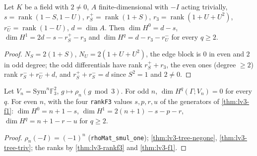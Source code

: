 \begin{theorem}\label{thm:lv3-tree-triv}
  \leanok
  Let $K$ be a field with $2\ne0$, $A$ finite-dimensional with $-I$ acting trivially, $s=\operatorname{rank}(1-S,1-U)$,
  $r_S^+=\operatorname{rank}(1+S)$, $r_3=\operatorname{rank}(1+U+U^2)$, $r_U^-=\operatorname{rank}(1-U)$, $d=\dim A$.  Then
  $\dim H^0=d-s$, $\dim H^1=2d-s-r_S^+-r_3$ and $\dim H^{q}=d-r_3-r_U^-$ for every $q\ge2$.
\end{theorem}
\begin{proof}
  \leanok
  $N_S=2(1+S)$, $N_U=2(1+U+U^2)$, the edge block is $0$ in even and $2$ in odd degree; the odd differentials have rank
  $r_S^++r_3$, the even ones (degree $\ge2$) rank $r_S^-+r_U^-+d$, and $r_S^++r_S^-=d$ since $S^2=1$ and $2\ne0$.
\end{proof}

\begin{theorem}\label{thm:lv3-v3-dims}
  \leanok
  Let $V_n=\mathrm{Sym}^n\mathbb F_3^2$, $g\mapsto\rho_n(g\bmod3)$.  For odd $n$, $\dim H^q(\Gamma;V_n)=0$ for every $q$.  For even $n$,
  with the four \texttt{rankF3} values $s,p,r,u$ of the generators of \ref{thm:lv3-f1}: $\dim H^0=n+1-s$, $\dim H^1=2(n+1)-s-p-r$,
  $\dim H^q=n+1-r-u$ for $q\ge2$.
\end{theorem}
\begin{proof}
  \leanok
  $\rho_n(-I)=(-1)^n$ (\texttt{rhoMat\_smul\_one}); \ref{thm:lv3-tree-negone}, \ref{thm:lv3-tree-triv}; the ranks by \ref{thm:lv3-rankf3}
  and \ref{thm:lv3-f1}.
\end{proof}

